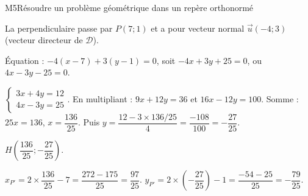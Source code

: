 \begin{fichemethode}{M5}{Résoudre un problème géométrique dans un repère orthonormé}
{  La perpendiculaire passe par $P(7 ; 1)$ et a pour vecteur normal $\vec{u}(-4 ; 3)$ (vecteur directeur de $\mathcal{D}$).

  Équation : $-4(x - 7) + 3(y - 1) = 0$, soit $-4x + 3y + 25 = 0$, ou $4x - 3y - 25 = 0$.

  $\begin{cases} 3x + 4y = 12 \\ 4x - 3y = 25 \end{cases}$.
  En multipliant : $9x + 12y = 36$ et $16x - 12y = 100$. Somme : $25x = 136$, $x = \dfrac{136}{25}$. Puis $y = \dfrac{12 - 3 \times 136/25}{4} = \dfrac{-108}{100} = -\dfrac{27}{25}$.

  $H\!\left(\dfrac{136}{25} ; -\dfrac{27}{25}\right)$.

  $x_{P'} = 2 \times \dfrac{136}{25} - 7 = \dfrac{272 - 175}{25} = \dfrac{97}{25}$.
  $y_{P'} = 2 \times \left(-\dfrac{27}{25}\right) - 1 = \dfrac{-54 - 25}{25} = -\dfrac{79}{25}$.
}




\end{fichemethode}
